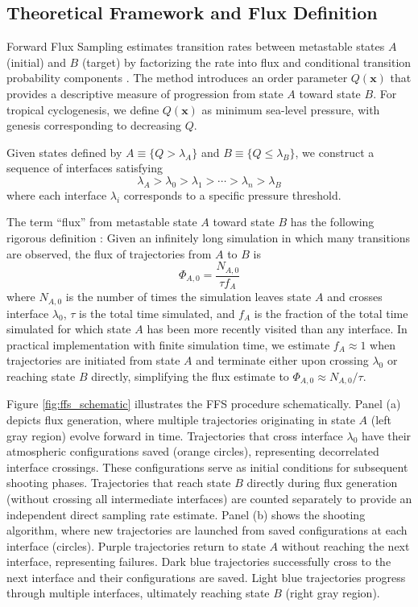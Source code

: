 \documentclass[11pt]{article}
\begin{document}
\subsection{Theoretical Framework and Flux Definition}

Forward Flux Sampling estimates transition rates between metastable states $A$ (initial) and $B$ (target) by factorizing the rate into flux and conditional transition probability components \citep{allen2006forward,allen2009forward}. The method introduces an order parameter $Q(\mathbf{x})$ that provides a descriptive measure of progression from state $A$ toward state $B$. For tropical cyclogenesis, we define $Q(\mathbf{x})$ as minimum sea-level pressure, with genesis corresponding to decreasing $Q$.

Given states defined by $A \equiv \{Q > \lambda_A\}$ and $B \equiv \{Q \leq \lambda_B\}$, we construct a sequence of interfaces satisfying
\begin{equation}
\lambda_A > \lambda_0 > \lambda_1 > \cdots > \lambda_n > \lambda_B
\end{equation}
where each interface $\lambda_i$ corresponds to a specific pressure threshold.

The term ``flux'' from metastable state $A$ toward state $B$ has the following rigorous definition \citep{allen2009forward}: Given an infinitely long simulation in which many transitions are observed, the flux of trajectories from $A$ to $B$ is
\begin{equation}
\Phi_{A,0} = \frac{N_{A,0}}{\tau f_A}
\label{eq:flux_definition}
\end{equation}
where $N_{A,0}$ is the number of times the simulation leaves state $A$ and crosses interface $\lambda_0$, $\tau$ is the total time simulated, and $f_A$ is the fraction of the total time simulated for which state $A$ has been more recently visited than any interface. In practical implementation with finite simulation time, we estimate $f_A \approx 1$ when trajectories are initiated from state $A$ and terminate either upon crossing $\lambda_0$ or reaching state $B$ directly, simplifying the flux estimate to $\Phi_{A,0} \approx N_{A,0}/\tau$.

Figure \ref{fig:ffs_schematic} illustrates the FFS procedure schematically. Panel (a) depicts flux generation, where multiple trajectories originating in state $A$ (left gray region) evolve forward in time. Trajectories that cross interface $\lambda_0$ have their atmospheric configurations saved (orange circles), representing decorrelated interface crossings. These configurations serve as initial conditions for subsequent shooting phases. Trajectories that reach state $B$ directly during flux generation (without crossing all intermediate interfaces) are counted separately to provide an independent direct sampling rate estimate. Panel (b) shows the shooting algorithm, where new trajectories are launched from saved configurations at each interface (circles). Purple trajectories return to state $A$ without reaching the next interface, representing failures. Dark blue trajectories successfully cross to the next interface and their configurations are saved. Light blue trajectories progress through multiple interfaces, ultimately reaching state $B$ (right gray region).
\end{document}
